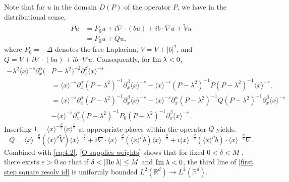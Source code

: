 \documentclass[11pt]{amsart}
\numberwithin{equation}{section}
\def\R{{\mathbb R}}
\def\Re{{\rm Re}\:}
\def\Im{{\rm Im}\:}
\begin{document}
Note that for $u$ in the domain $D(P)$ of the operator $P$, we have in the distributional sense,
\begin{equation}
\begin{split}
Pu &=P_0 u+i\nabla\cdot (bu)+ib\cdot\nabla u+\widetilde Vu\\
&=P_0u+Qu,
\end{split}
\end{equation}
where $P_0 = -\Delta$ denotes the free Laplacian, $\widetilde V=V+|b|^2$, and $Q=\widetilde V + i\nabla\cdot (bu)+ib\cdot\nabla u$. Consequently, for $\Im \lambda < 0$,
\begin{equation} \label{first step square resolv id}
\begin{split}
 -\lambda^2\langle x \rangle^{-s}  \partial^\alpha_x(&P-\lambda^2)^{-2}  \partial^\beta_x\langle x \rangle^{-s}\\
 &=\langle x \rangle^{-s}  \partial^\alpha_x(P-\lambda^2)^{-1}  \partial^\beta_x \langle x \rangle^{-s}- \langle x \rangle^{-s}(P-\lambda^2)^{-1}P(P-\lambda^2)^{-1}\langle x \rangle^{-s},\\
 &=\langle x \rangle^{-s}  \partial^\alpha_x(P-\lambda^2)^{-1}  \partial^\beta_x\langle x \rangle^{-s}-\langle x \rangle^{-s}  \partial^\alpha_x (P-\lambda^2)^{-1}Q(P-\lambda^2)^{-1}  \partial^\beta_x \langle x \rangle^{-s}\\
 &-\langle x \rangle^{-s} \partial^\alpha_x(P-\lambda^2)^{-1}P_0(P-\lambda^2)^{-1}  \partial^\beta_x\langle x \rangle^{-s}.
 \end{split}
 \end{equation}
Inserting $1 = \langle x \rangle^{-\frac{\rho}{2}} \langle x \rangle^{\frac{\rho}{2}}$ at appropriate places within the operator $Q$ yields.
\begin{equation} \label{Q supplies weights}
Q = \langle x \rangle^{-\frac{\rho}{2}} (\langle x \rangle^{\rho} \widetilde V) \langle x \rangle^{-\frac{\rho}{2}} + i \nabla \cdot \langle x \rangle^{-\frac{\rho}{2}} (\langle x \rangle^{\rho} b) \langle x \rangle^{-\frac{\rho}{2}} + i \langle x \rangle^{-\frac{\rho}{2}} (\langle x \rangle^{\rho}b)\cdot \langle x \rangle^{-\frac{\rho}{2}} \nabla.  
\end{equation}
Combined with \eqref{eq:4.2}, \eqref{Q supplies weights} shows that for fixed $0 < \delta < M$ , there exists $\varepsilon > 0$ so that if $\delta < |\Re \lambda| \le M$ and $ \Im \lambda < 0$, the third line of \eqref{first step square resolv id} is uniformly bounded $L^2(\R^d) \to L^2(\R^d)$. 
\end{document}
